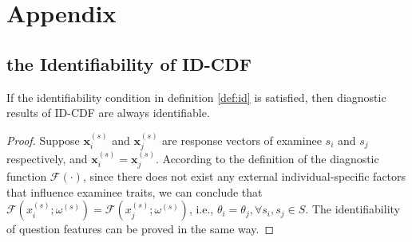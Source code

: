 \documentclass[sigconf]{acmart}
\begin{document}


\newpage



\newpage

\appendix 
\section{Appendix}
\subsection{the Identifiability of ID-CDF}\label{sec:proof}
\begin{theorem}\label{theorem:identifiability}
  If the identifiability condition in definition \ref{def:id} is satisfied, then diagnostic results of ID-CDF are always identifiable.
\vspace{-5pt}
\end{theorem}

\begin{proof}
Suppose $\bm{x}^{(s)}_i$ and $\bm{x}^{(s)}_j$ are response vectors of examinee $s_i$ and $s_j$ respectively, and $\bm{x}^{(s)}_i = \bm{x}^{(s)}_j$. According to the definition of the diagnostic function $\mathcal{F}(\cdot)$, since there does not exist any external individual-specific factors that influence examinee traits, we can conclude that $\mathcal{F}(x^{(s)}_i;\omega^{(s)}) = \mathcal{F}(x^{(s)}_j;\omega^{(s)})$, i.e., $\theta_i = \theta_j,\forall s_i, s_j\in S$. The identifiability of question features can be proved in the same way.
\end{proof}
\end{document}
